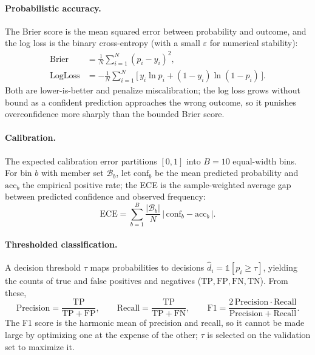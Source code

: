 \paragraph{Probabilistic accuracy.} The Brier score is the mean squared error
between probability and outcome, and the log loss is the binary cross-entropy
(with a small \(\varepsilon\) for numerical stability):
\begin{align}
  \mathrm{Brier}   &= \frac{1}{N}\sum_{i=1}^{N} (p_i - y_i)^2, \\
  \mathrm{LogLoss} &= -\frac{1}{N}\sum_{i=1}^{N}
     \Big[\, y_i \ln p_i + (1-y_i)\ln(1-p_i) \,\Big].
\end{align}
Both are lower-is-better and penalize miscalibration; the log loss grows without
bound as a confident prediction approaches the wrong outcome, so it punishes
overconfidence more sharply than the bounded Brier score.

\paragraph{Calibration.} The expected calibration error partitions
\([0,1]\) into \(B = 10\) equal-width bins. For bin \(b\) with member set
\(\mathcal{B}_b\), let \(\mathrm{conf}_b\) be the mean predicted probability and
\(\mathrm{acc}_b\) the empirical positive rate; the ECE is the sample-weighted
average gap between predicted confidence and observed frequency:
\begin{equation}
  \mathrm{ECE} = \sum_{b=1}^{B} \frac{|\mathcal{B}_b|}{N}\,
    \big|\,\mathrm{conf}_b - \mathrm{acc}_b\,\big|.
\end{equation}

\paragraph{Thresholded classification.} A decision threshold \(\tau\) maps
probabilities to decisions \(\hat{d}_i = \mathbb{1}[p_i \ge \tau]\), yielding the
counts of true and false positives and negatives (\(\mathrm{TP}, \mathrm{FP},
\mathrm{FN}, \mathrm{TN}\)). From these,
\begin{equation}
  \mathrm{Precision} = \frac{\mathrm{TP}}{\mathrm{TP}+\mathrm{FP}}, \qquad
  \mathrm{Recall} = \frac{\mathrm{TP}}{\mathrm{TP}+\mathrm{FN}}, \qquad
  \mathrm{F1} = \frac{2\,\mathrm{Precision}\cdot\mathrm{Recall}}
                    {\mathrm{Precision}+\mathrm{Recall}} .
\end{equation}
The F1 score is the harmonic mean of precision and recall, so it cannot be made
large by optimizing one at the expense of the other; \(\tau\) is selected on the
validation set to maximize it.

